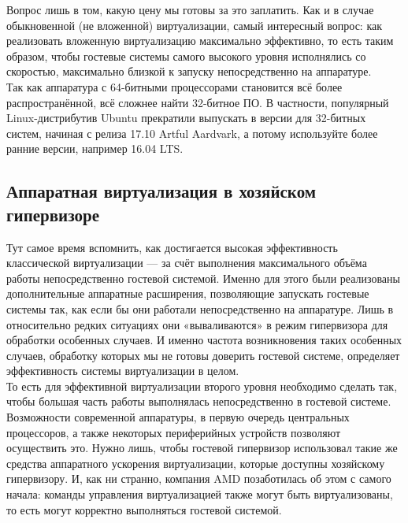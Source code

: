 \documentclass[14pt, a4paper]{article}
\begin{document}
Вопрос лишь в том, какую цену мы готовы за это заплатить. Как и в случае обыкновенной (не
вложенной) виртуализации, самый интересный вопрос: как реализовать вложенную виртуализацию
максимально эффективно, то есть таким образом, чтобы гостевые системы самого высокого уровня
исполнялись со скоростью, максимально близкой к запуску непосредственно на аппаратуре.\\

Так как аппаратура с 64-битными процессорами становится всё более распространённой, всё
сложнее найти 32-битное ПО. В частности, популярный Linux-дистрибутив Ubuntu прекратили
выпускать в версии для 32-битных систем, начиная с релиза 17.10 Artful Aardvark, а потому
используйте более ранние версии, например 16.04 LTS.

\subsection*{Аппаратная виртуализация в хозяйском гипервизоре}

Тут самое время вспомнить, как достигается высокая эффективность классической виртуализации —
за счёт выполнения максимального объёма работы непосредственно гостевой системой. Именно для
этого были реализованы дополнительные аппаратные расширения, позволяющие запускать гостевые
системы так, как если бы они работали непосредственно на аппаратуре. Лишь в относительно редких
ситуациях они «вываливаются» в режим гипервизора для обработки особенных случаев. И именно
частота возникновения таких особенных случаев, обработку которых мы не готовы доверить гостевой
системе, определяет эффективность системы виртуализации в целом.\\

То есть для эффективной виртуализации второго уровня необходимо сделать так, чтобы большая
часть работы выполнялась непосредственно в гостевой системе. Возможности современной аппаратуры, 
в первую очередь центральных процессоров, а также некоторых периферийных
устройств позволяют осуществить это. Нужно лишь, чтобы гостевой гипервизор использовал такие же
средства аппаратного ускорения виртуализации, которые доступны хозяйскому гипервизору. И, как ни
странно, компания AMD позаботилась об этом с самого начала: команды управления виртуализацией
также могут быть виртуализованы, то есть могут корректно выполняться гостевой системой.\\
\end{document}
